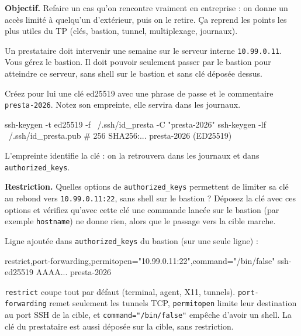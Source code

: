 \documentclass[a4paper,10pt]{exam}
\begin{document}
\textbf{Objectif.} Refaire un cas qu'on rencontre vraiment en entreprise : on donne un
accès limité à quelqu'un d'extérieur, puis on le retire. Ça reprend les points les plus
utiles du TP (clés, bastion, tunnel, multiplexage, journaux).

Un prestataire doit intervenir une semaine sur le serveur interne \texttt{10.99.0.11}.
Vous gérez le bastion. Il doit pouvoir seulement passer par le bastion pour atteindre ce
serveur, sans shell sur le bastion et sans clé déposée dessus.

\begin{questions}
\question Créez pour lui une clé ed25519 avec une phrase de passe et le commentaire
\texttt{presta-2026}. Notez son empreinte, elle servira dans les journaux.
\begin{solution}
\begin{bashcode}
ssh-keygen -t ed25519 -f ~/.ssh/id_presta -C "presta-2026"
ssh-keygen -lf ~/.ssh/id_presta.pub
# 256 SHA256:... presta-2026 (ED25519)
\end{bashcode}
L'empreinte identifie la clé : on la retrouvera dans les journaux et dans
\texttt{authorized\_keys}.
\end{solution}
\question \textbf{Restriction.} Quelles options de \texttt{authorized\_keys} permettent de
limiter sa clé au rebond vers \texttt{10.99.0.11:22}, sans shell sur le bastion ?
Déposez la clé avec ces options et vérifiez qu'avec cette clé une commande lancée sur le
bastion (par exemple \texttt{hostname}) ne donne rien, alors que le passage vers la cible
marche.
\begin{solution}
Ligne ajoutée dans \texttt{authorized\_keys} du bastion (sur une seule ligne) :
\begin{bashcode}
restrict,port-forwarding,permitopen="10.99.0.11:22",command="/bin/false" ssh-ed25519 AAAA... presta-2026
\end{bashcode}
\texttt{restrict} coupe tout par défaut (terminal, agent, X11, tunnels).
\texttt{port-forwarding} remet seulement les tunnels TCP, \texttt{permitopen} limite leur
destination au port SSH de la cible, et \texttt{command="/bin/false"} empêche d'avoir un
shell. La clé du prestataire est aussi déposée sur la cible, sans restriction.
\end{solution}
\end{questions}
\end{document}
